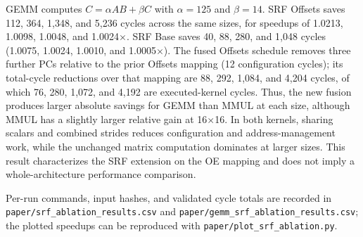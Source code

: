 {GEMM computes $C=\alpha AB+\beta C$ with $\alpha=125$ and $\beta=14$.
SRF Offsets saves 112, 364, 1,348, and 5,236 cycles across the same sizes,
for speedups of 1.0213, 1.0098, 1.0048, and 1.0024$\times$. SRF Base saves
40, 88, 280, and 1,048 cycles (1.0075, 1.0024, 1.0010, and 1.0005$\times$).
The fused Offsets schedule removes three further PCs relative to the prior
Offsets mapping (12 configuration cycles); its total-cycle reductions over
that mapping are 88, 292, 1,084, and 4,204 cycles, of which 76, 280, 1,072,
and 4,192 are executed-kernel cycles. Thus, the new fusion produces larger
absolute savings for GEMM than MMUL at each size, although MMUL has a slightly
larger relative gain at 16$\times$16. In both kernels, sharing scalars and
combined strides reduces configuration and address-management work, while
the unchanged matrix computation dominates at larger sizes. This result
characterizes the SRF extension on the OE mapping and does not imply a
whole-architecture performance comparison.

Per-run commands, input hashes, and validated cycle totals are recorded in
\texttt{paper/srf\_ablation\_results.csv} and
\texttt{paper/gemm\_srf\_ablation\_results.csv}; the plotted speedups can be
reproduced with \texttt{paper/plot\_srf\_ablation.py}.
}
